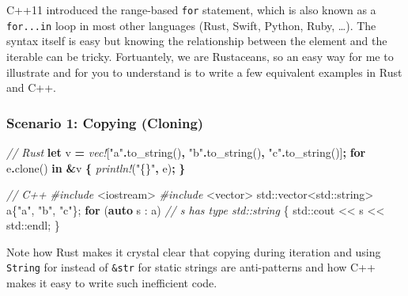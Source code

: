 \documentclass[
]{book}
\newenvironment{Shaded}{\begin{snugshade}}{\end{snugshade}}
\newcommand{\BuiltInTok}[1]{#1}
\newcommand{\CommentTok}[1]{\textcolor[rgb]{0.56,0.35,0.01}{\textit{#1}}}
\newcommand{\ControlFlowTok}[1]{\textcolor[rgb]{0.13,0.29,0.53}{\textbf{#1}}}
\newcommand{\ImportTok}[1]{#1}
\newcommand{\KeywordTok}[1]{\textcolor[rgb]{0.13,0.29,0.53}{\textbf{#1}}}
\newcommand{\NormalTok}[1]{#1}
\newcommand{\OperatorTok}[1]{\textcolor[rgb]{0.81,0.36,0.00}{\textbf{#1}}}
\newcommand{\PreprocessorTok}[1]{\textcolor[rgb]{0.56,0.35,0.01}{\textit{#1}}}
\newcommand{\StringTok}[1]{\textcolor[rgb]{0.31,0.60,0.02}{#1}}
\begin{document}
C++11 introduced the range-based \texttt{for} statement, which is also known as a \texttt{for...in} loop in most other languages (Rust, Swift, Python, Ruby, \ldots). The syntax itself is easy but knowing the relationship between the element and the iterable can be tricky. Fortuantely, we are Rustaceans, so an easy way for me to illustrate and for you to understand is to write a few equivalent examples in Rust and C++.

\hypertarget{scenario-1-copying-cloning}{%
\subsubsection{Scenario 1: Copying (Cloning)}\label{scenario-1-copying-cloning}}

\begin{Shaded}
\begin{Highlighting}[]
\CommentTok{// Rust}
\KeywordTok{let}\NormalTok{ v }\OperatorTok{=} \PreprocessorTok{vec!}\NormalTok{[}\StringTok{"a"}\OperatorTok{.}\NormalTok{to\_string()}\OperatorTok{,} \StringTok{"b"}\OperatorTok{.}\NormalTok{to\_string()}\OperatorTok{,} \StringTok{"c"}\OperatorTok{.}\NormalTok{to\_string()]}\OperatorTok{;}
\KeywordTok{for}\NormalTok{ e}\OperatorTok{.}\NormalTok{clone() }\KeywordTok{in} \OperatorTok{\&}\NormalTok{v }\OperatorTok{\{}
    \PreprocessorTok{println!}\NormalTok{(}\StringTok{"\{\}"}\OperatorTok{,}\NormalTok{ e)}\OperatorTok{;}
\OperatorTok{\}}
\end{Highlighting}
\end{Shaded}

\begin{Shaded}
\begin{Highlighting}[]
\CommentTok{// C++}
\PreprocessorTok{\#include }\ImportTok{\textless{}iostream\textgreater{}}
\PreprocessorTok{\#include }\ImportTok{\textless{}vector\textgreater{}}
\BuiltInTok{std::}\NormalTok{vector\textless{}}\BuiltInTok{std::}\NormalTok{string\textgreater{} a\{}\StringTok{"a"}\NormalTok{, }\StringTok{"b"}\NormalTok{, }\StringTok{"c"}\NormalTok{\};}
\ControlFlowTok{for}\NormalTok{ (}\KeywordTok{auto}\NormalTok{ s : a) }\CommentTok{// s has type \textasciigrave{}std::string\textasciigrave{}}
\NormalTok{\{}
    \BuiltInTok{std::}\NormalTok{cout \textless{}\textless{} s \textless{}\textless{} }\BuiltInTok{std::}\NormalTok{endl;}
\NormalTok{\}}
\end{Highlighting}
\end{Shaded}

Note how Rust makes it crystal clear that copying during iteration and using \texttt{String} for instead of \texttt{\&str} for static strings are anti-patterns and how C++ makes it easy to write such inefficient code.
\end{document}
